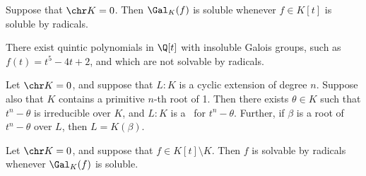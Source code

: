 \documentclass[a4paper]{article}
\begin{document}
\begin{tcorollary}
  Suppose that \( \chr K = 0 \).
  Then \( \Gal_K(f) \) is soluble whenever \( f\in K[t] \) is soluble by radicals.
\end{tcorollary}

\begin{tcorollary}
  There exist quintic polynomials in \( \Q[t] \) with insoluble Galois groups, such as \( f(t) = t^5-4t+2 \), and which are not solvable by radicals.
\end{tcorollary}

\begin{tlemma}
  Let \( \chr K = 0 \), and suppose that \( L:K \) is a cyclic extension of degree \( n \).
  Suppose also that \( K \) contains a primitive \( n \)-th root of 1.
  Then there exists \( \theta \in K \) such that \( t^n -\theta \) is irreducible over \( K \), and \( L:K \) is a \sf~for \( t^n-\theta \).
  Further, if \( \beta \) is a root of \( t^n-\theta \) over \( L \), then \( L=K(\beta) \).
\end{tlemma}

\begin{ttheorem}
  Let \( \chr K = 0 \), and suppose that \( f\in K[t]\setminus K \).
  Then \( f \) is solvable by radicals whenever \( \Gal_K(f) \) is soluble.
\end{ttheorem}
\end{document}
